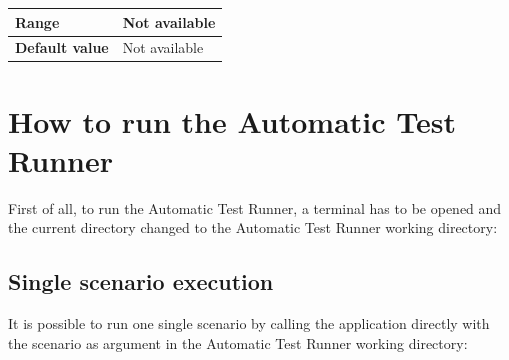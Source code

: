 \documentclass{template/openetcs}
\begin{document}
\begin{itemize}
\begin{longtable}{|l|l|}
				\hline
																																									
					\begin{minipage}[t]{0.22\linewidth} \textbf{Range}	\end{minipage} 
				&	\begin{minipage}[t]{0.78\linewidth} Not available \end{minipage} \\
				
				\hline
				
					\begin{minipage}[t]{0.22\linewidth} \textbf{Default value}	\end{minipage} 
				&	\begin{minipage}[t]{0.78\linewidth} Not available \end{minipage} \\
				
				\hline				
			\end{longtable}				
	\end{itemize}
\section{How to run the Automatic Test Runner}
First of all, to run the Automatic Test Runner, a terminal has to be opened and the current directory changed to the Automatic Test Runner working directory:
\newline
{}
\subsection{Single scenario execution}
It is possible to run one single scenario by calling the application directly with the scenario as argument in the Automatic Test Runner working directory:
\newline 
{}
\end{document}
